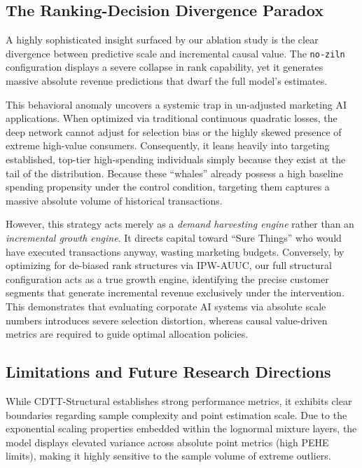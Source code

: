 \documentclass[10pt, conference]{IEEEtran}
\newcommand{\ourmodel}{CDTT}
\begin{document}
\subsection{The Ranking-Decision Divergence Paradox}
A highly sophisticated insight surfaced by our ablation study is the clear divergence between predictive scale and incremental causal value. The \texttt{no-ziln} configuration displays a severe collapse in rank capability, yet it generates massive absolute revenue predictions that dwarf the full model's estimates. 

This behavioral anomaly uncovers a systemic trap in un-adjusted marketing AI applications. When optimized via traditional continuous quadratic losses, the deep network cannot adjust for selection bias or the highly skewed presence of extreme high-value consumers. Consequently, it leans heavily into targeting established, top-tier high-spending individuals simply because they exist at the tail of the distribution. Because these ``whales'' already possess a high baseline spending propensity under the control condition, targeting them captures a massive absolute volume of historical transactions. 

However, this strategy acts merely as a \textit{demand harvesting engine} rather than an \textit{incremental growth engine}. It directs capital toward ``Sure Things'' who would have executed transactions anyway, wasting marketing budgets. Conversely, by optimizing for de-biased rank structures via IPW-AUUC, our full structural configuration acts as a true growth engine, identifying the precise customer segments that generate incremental revenue exclusively under the intervention. This demonstrates that evaluating corporate AI systems via absolute scale numbers introduces severe selection distortion, whereas causal value-driven metrics are required to guide optimal allocation policies.

\subsection{Limitations and Future Research Directions}
While \ourmodel-Structural establishes strong performance metrics, it exhibits clear boundaries regarding sample complexity and point estimation scale. Due to the exponential scaling properties embedded within the lognormal mixture layers, the model displays elevated variance across absolute point metrics (high PEHE limits), making it highly sensitive to the sample volume of extreme outliers. 
\end{document}
